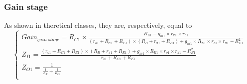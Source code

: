 \subsubsection{Gain stage}
As shown in theretical classes, they are, respectively, equal to 
\begin{equation}
\begin{cases}
Gain_{gain \ stage} = R_{C1} \times \frac{R_{E1}-g_{m1} \times r_{\pi 1} \times r_{o1}}{(r_{o1}+R_{C1}+R_{E1})\times(R_B+r_{\pi 1}+R_{E1})+g_{m1} \times R_{E1} \times r_{o1} \times r_{\pi 1} - R_{E1}^2} \\ %
Z_{I1} = \frac{(r_{o1}+R_{C1}+R_{E1}) \times (R_B+r_{\pi 1}+R_{E1}) + g_{m1} \times R_{E1} \times r_{o1} \times r_{\pi 1} - R_{E1}^2}{r_{o1} + R_{C1} + R_{E1}} \\ %
Z_{O1} = \frac{1}{\frac{1}{Z_X}+\frac{1}{R_{C1}}} \\ %
\end{cases}
\end{equation}

